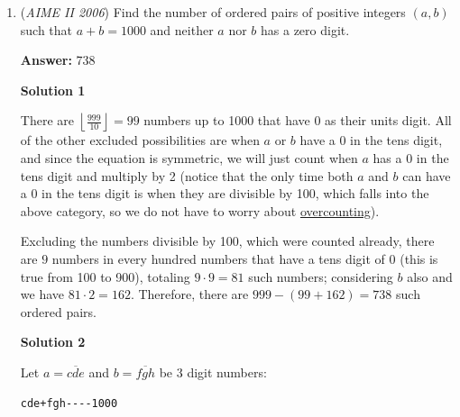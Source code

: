 \begin{enumerate}
\textbf{Solution 6 (substitution)}

The equilateral triangle formed is symmetric about the centre of the square. Therefore, $DF = BE = a$ and $FC = CE = b$, so we have $a+b = 1$ and $2b^2 = a^2 +1$. Solving, the only viable solution is $a = 2 -\sqrt{3}$ and $b = \sqrt{3} - 1$.

 Now, let the side length of the second square be $p$ and the remaining side length that composes $a$ be $q$. Then, through similarity, we have $\frac{p}{1-p} = p+q$ and $p+q = 2 - \sqrt{3}$. Substituting, we have $p = (2-\sqrt{3})(1-p)$ and solving gives $p = \frac{3-\sqrt{3}}{6} \implies \boxed{012}$.

 


	\item (\textit{AIME II 2006}) Find the number of ordered pairs of positive integers $(a,b)$ such that $a+b=1000$ and neither $a$ nor $b$ has a zero digit.


 
 \textbf{Answer: }738



\textbf{Solution 1}

There are $\left\lfloor\frac{999}{10}\right\rfloor = 99$ numbers up to 1000 that have 0 as their units digit. All of the other excluded possibilities are when $a$ or $b$ have a 0 in the tens digit, and since the equation is symmetric, we will just count when $a$ has a 0 in the tens digit and multiply by 2 (notice that the only time both $a$ and $b$ can have a 0 in the tens digit is when they are divisible by 100, which falls into the above category, so we do not have to worry about \href{https://artofproblemsolving.com/wiki/index.php?title=Principle\_of\_Inclusion-Exclusion}{overcounting}). 

 Excluding the numbers divisible by 100, which were counted already, there are $9$ numbers in every hundred numbers that have a tens digit of 0 (this is true from 100 to 900), totaling $9 \cdot 9 = 81$ such numbers; considering $b$ also and we have $81 \cdot 2 = 162$. Therefore, there are $999 - (99 + 162) = \boxed{738}$ such ordered pairs.

 



\textbf{Solution 2}

Let $a = \overline{cde}$ and $b = \overline{fgh}$ be 3 digit numbers:

 \begin{verbatim}
cde+fgh----1000
\end{verbatim}


\end{enumerate}
